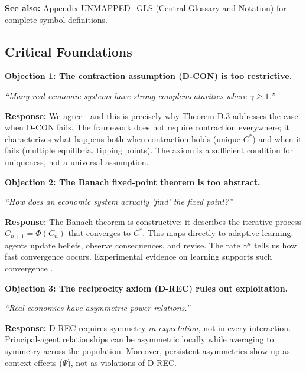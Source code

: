 \textbf{See also:} Appendix UNMAPPED_GLS (Central Glossary and Notation) for complete symbol definitions.


\subsection{Critical Foundations}
\label{sec:D-foundations}

\begin{tcolorbox}[colback=red!5!white, colframe=red!75!black,
    title=\textbf{Critical Foundations: Objections and Responses}]

\textbf{Objection 1: The contraction assumption (D-CON) is too restrictive.}

\textit{``Many real economic systems have strong complementarities where $\gamma \geq 1$.''}

\textbf{Response:} We agree---and this is precisely why Theorem D.3 addresses the
case when D-CON fails. The framework does not require contraction everywhere;
it characterizes what happens both when contraction holds (unique $C^*$) and
when it fails (multiple equilibria, tipping points). The axiom is a sufficient
condition for uniqueness, not a universal assumption.

\medskip

\textbf{Objection 2: The Banach fixed-point theorem is too abstract.}

\textit{``How does an economic system actually 'find' the fixed point?''}

\textbf{Response:} The Banach theorem is constructive: it describes the iterative
process $C_{n+1} = \Phi(C_n)$ that converges to $C^*$. This maps directly to
adaptive learning: agents update beliefs, observe consequences, and revise.
The rate $\gamma^n$ tells us how fast convergence occurs. Experimental evidence
on learning supports such convergence \citep{camerer2003behavioral}.

\medskip

\textbf{Objection 3: The reciprocity axiom (D-REC) rules out exploitation.}

\textit{``Real economies have asymmetric power relations.''}

\textbf{Response:} D-REC requires symmetry \emph{in expectation}, not in every
interaction. Principal-agent relationships can be asymmetric locally while
averaging to symmetry across the population. Moreover, persistent asymmetries
show up as context effects ($\Psi$), not as violations of D-REC.


\end{tcolorbox}
